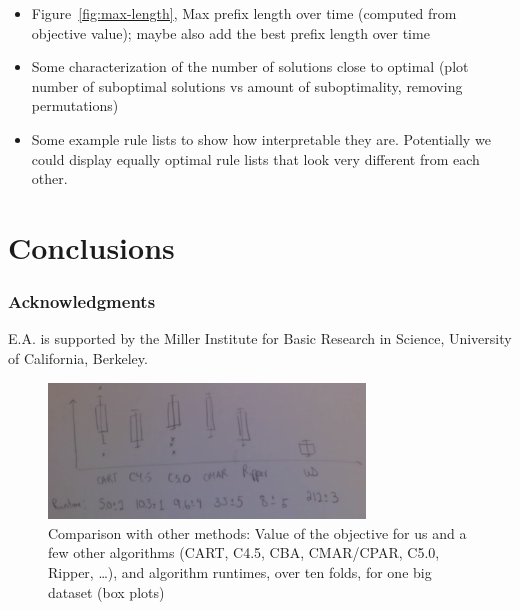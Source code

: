\begin{itemize}
\item Figure~\ref{fig:max-length},
Max prefix length over time (computed from objective value);
maybe also add the best prefix length over time

\item Some characterization of the number of solutions close to optimal
(plot number of suboptimal solutions vs amount of suboptimality,
removing permutations)

\item Some example rule lists to show how interpretable they are.
Potentially we could display equally optimal rule lists that look
very different from each other.

\end{itemize}

\section{Conclusions}

\subsubsection*{Acknowledgments}

E.A. is supported by the Miller Institute for Basic Research in Science,
University of California, Berkeley.




\newpage

\begin{figure}[t!]
\begin{center}
\includegraphics[width=0.75\textwidth]{figs/sketch-comparison.png}
\end{center}
\caption{Comparison with other methods:
Value of the objective for us and a few other algorithms
(CART, C4.5, CBA, CMAR/CPAR, C5.0, Ripper, \dots), and algorithm runtimes,
over ten folds, for one big dataset (box plots)}
\label{fig:comparison}
\end{figure}

